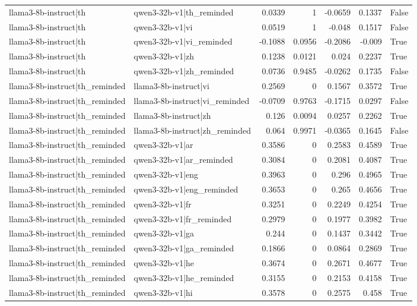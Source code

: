 \begin{table}
\begin{tabular}{l l r r r r l}
llama3-8b-instruct|th & qwen3-32b-v1|th_reminded & 0.0339 & 1 & -0.0659 & 0.1337 & False \\
llama3-8b-instruct|th & qwen3-32b-v1|vi & 0.0519 & 1 & -0.048 & 0.1517 & False \\
llama3-8b-instruct|th & qwen3-32b-v1|vi_reminded & -0.1088 & 0.0956 & -0.2086 & -0.009 & True \\
llama3-8b-instruct|th & qwen3-32b-v1|zh & 0.1238 & 0.0121 & 0.024 & 0.2237 & True \\
llama3-8b-instruct|th & qwen3-32b-v1|zh_reminded & 0.0736 & 0.9485 & -0.0262 & 0.1735 & False \\
llama3-8b-instruct|th_reminded & llama3-8b-instruct|vi & 0.2569 & 0 & 0.1567 & 0.3572 & True \\
llama3-8b-instruct|th_reminded & llama3-8b-instruct|vi_reminded & -0.0709 & 0.9763 & -0.1715 & 0.0297 & False \\
llama3-8b-instruct|th_reminded & llama3-8b-instruct|zh & 0.126 & 0.0094 & 0.0257 & 0.2262 & True \\
llama3-8b-instruct|th_reminded & llama3-8b-instruct|zh_reminded & 0.064 & 0.9971 & -0.0365 & 0.1645 & False \\
llama3-8b-instruct|th_reminded & qwen3-32b-v1|ar & 0.3586 & 0 & 0.2583 & 0.4589 & True \\
llama3-8b-instruct|th_reminded & qwen3-32b-v1|ar_reminded & 0.3084 & 0 & 0.2081 & 0.4087 & True \\
llama3-8b-instruct|th_reminded & qwen3-32b-v1|eng & 0.3963 & 0 & 0.296 & 0.4965 & True \\
llama3-8b-instruct|th_reminded & qwen3-32b-v1|eng_reminded & 0.3653 & 0 & 0.265 & 0.4656 & True \\
llama3-8b-instruct|th_reminded & qwen3-32b-v1|fr & 0.3251 & 0 & 0.2249 & 0.4254 & True \\
llama3-8b-instruct|th_reminded & qwen3-32b-v1|fr_reminded & 0.2979 & 0 & 0.1977 & 0.3982 & True \\
llama3-8b-instruct|th_reminded & qwen3-32b-v1|ga & 0.244 & 0 & 0.1437 & 0.3442 & True \\
llama3-8b-instruct|th_reminded & qwen3-32b-v1|ga_reminded & 0.1866 & 0 & 0.0864 & 0.2869 & True \\
llama3-8b-instruct|th_reminded & qwen3-32b-v1|he & 0.3674 & 0 & 0.2671 & 0.4677 & True \\
llama3-8b-instruct|th_reminded & qwen3-32b-v1|he_reminded & 0.3155 & 0 & 0.2153 & 0.4158 & True \\
llama3-8b-instruct|th_reminded & qwen3-32b-v1|hi & 0.3578 & 0 & 0.2575 & 0.458 & True \\

\end{tabular}
\end{table}
